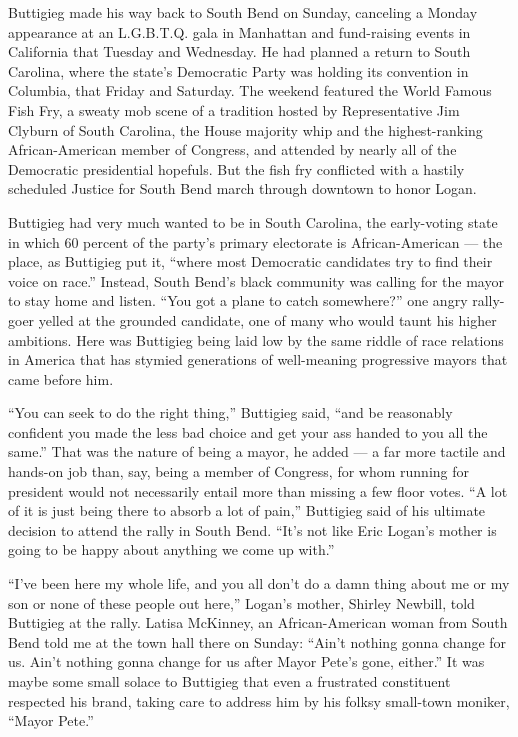 Buttigieg made his way back to South Bend on Sunday, canceling a Monday
appearance at an L.G.B.T.Q. gala in Manhattan and fund-raising events in
California that Tuesday and Wednesday. He had planned a return to South
Carolina, where the state's Democratic Party was holding its convention
in Columbia, that Friday and Saturday. The weekend featured the World
Famous Fish Fry, a sweaty mob scene of a tradition hosted by
Representative Jim Clyburn of South Carolina, the House majority whip
and the highest-ranking African-American member of Congress, and
attended by nearly all of the Democratic presidential hopefuls. But the
fish fry conflicted with a hastily scheduled Justice for South Bend
march through downtown to honor Logan.

Buttigieg had very much wanted to be in South Carolina, the early-voting
state in which 60 percent of the party's primary electorate is
African-American --- the place, as Buttigieg put it, ``where most
Democratic candidates try to find their voice on race.'' Instead, South
Bend's black community was calling for the mayor to stay home and
listen. ``You got a plane to catch somewhere?'' one angry rally-goer
yelled at the grounded candidate, one of many who would taunt his higher
ambitions. Here was Buttigieg being laid low by the same riddle of race
relations in America that has stymied generations of well-meaning
progressive mayors that came before him.

``You can seek to do the right thing,'' Buttigieg said, ``and be
reasonably confident you made the less bad choice and get your ass
handed to you all the same.'' That was the nature of being a mayor, he
added --- a far more tactile and hands-on job than, say, being a member
of Congress, for whom running for president would not necessarily entail
more than missing a few floor votes. ``A lot of it is just being there
to absorb a lot of pain,'' Buttigieg said of his ultimate decision to
attend the rally in South Bend. ``It's not like Eric Logan's mother is
going to be happy about anything we come up with.''

``I've been here my whole life, and you all don't do a damn thing about
me or my son or none of these people out here,'' Logan's mother, Shirley
Newbill, told Buttigieg at the rally. Latisa McKinney, an
African-American woman from South Bend told me at the town hall there on
Sunday: ``Ain't nothing gonna change for us. Ain't nothing gonna change
for us after Mayor Pete's gone, either.'' It was maybe some small solace
to Buttigieg that even a frustrated constituent respected his brand,
taking care to address him by his folksy small-town moniker, ``Mayor
Pete.''

